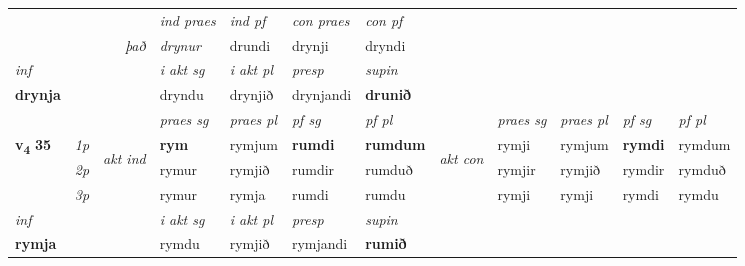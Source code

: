 \begin{longtable}[l]{X>{\footnotesize\itshape}llXXXXlXXXX}
   && &  \textit{ind praes} & \textit{ind pf} & \textit{con praes} & \textit{con pf} \\*
\multicolumn{3}{r}{\textit{það}} & drynur & drundi & drynji & dryndi \\*

\cmidrule{4-7}
   {\textit{inf}} & &  & \textit{i akt sg} & \textit{i akt pl}   & \textit{presp} & \textit{supin}   \\*
  {\textbf{drynja}} & && dryndu  & drynjið   & drynjandi &  \textbf{drunið}   \\*

\midrule

 & &   & \textit{praes sg}  & \textit{praes pl}    & \textit{ pf sg} & \textit{pf pl} & & \textit{praes sg}  & \textit{praes pl}    & \textit{pf sg} & \textit{pf pl }  \\ \cmidrule{4-7} \cmidrule{9-12}
 \multirow{2}{*}{{{\textbf{v{\textsubscript{4}}} \Large{\textbf{35}}}}}  & 1p & \multirow{3}{*}{\begin{turn}{90}\textit{akt ind}\end{turn}} & \textbf{rym} & rymjum & \textbf{rumdi} & \textbf{rumdum} & \multirow{3}{*}{\begin{turn}{90}\textit{akt con}\end{turn}} &rymji & rymjum & \textbf{rymdi} & rymdum\\*
 & 2p &  &  rymur  & rymjið & rumdir & rumduð & & rymjir & rymjið & rymdir & rymduð \\*
 & 3p &  & rymur & rymja & rumdi & rumdu & & rymji & rymji& rymdi & rymdu \\*
\cmidrule{4-7} \cmidrule{9-12}

   {\textit{inf}} & &  & \textit{i akt sg} & \textit{i akt pl}   & \textit{presp} & \textit{supin}   \\*
  {\textbf{rymja}} & && rymdu  & rymjið   & rymjandi &  \textbf{rumið}   \\*

\midrule


\end{longtable}
